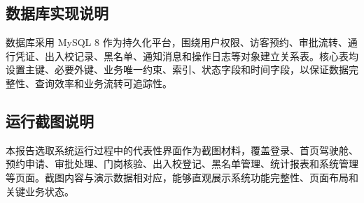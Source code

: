 \subsection{数据库实现说明}
数据库采用 MySQL 8 作为持久化平台，围绕用户权限、访客预约、审批流转、通行凭证、出入校记录、黑名单、通知消息和操作日志等对象建立关系表。核心表均设置主键、必要外键、业务唯一约束、索引、状态字段和时间字段，以保证数据完整性、查询效率和业务流转可追踪性。

\subsection{运行截图说明}
本报告选取系统运行过程中的代表性界面作为截图材料，覆盖登录、首页驾驶舱、预约申请、审批处理、门岗核验、出入校登记、黑名单管理、统计报表和系统管理等页面。截图内容与演示数据相对应，能够直观展示系统功能完整性、页面布局和关键业务状态。

